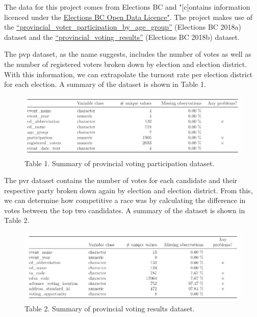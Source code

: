 \documentclass[
]{article}
\begin{document}
The data for this project comes from Elections BC and "{[}c{]}ontains
information licenced under the
\href{https://www.elections.bc.ca/docs/EBC-Open-Data-Licence.pdf}{Elections
BC Open Data Licence"}. The project makes use of the
\href{https://catalogue.data.gov.bc.ca/dataset/6d9db663-8c30-43ec-922b-d541d22e634f/resource/646530d4-078c-4815-8452-c75639962bb4}{``provincial\_voter\_participation\_by\_age\_group''}
(Elections BC 2018a) dataset and the
\href{https://catalogue.data.gov.bc.ca/dataset/44914a35-de9a-4830-ac48-870001ef8935/resource/fb40239e-b718-4a79-b18f-7a62139d9792}{``provincial\_voting\_results''}
(Elections BC 2018b) dataset.

The pvp dataset, as the name suggests, includes the number of votes as
well as the number of registered voters broken down by election and
election district. With this information, we can extrapolate the turnout
rate per election district for each election. A summary of the dataset
is shown in Table 1.

\begin{figure}
\includegraphics[width=1\linewidth]{../eda/bc_election_turnout_files/figure-html/pvp} \caption{Table 1. Summary of provincial voting participation dataset.}\label{fig:tab_1}
\end{figure}

The pvr dataset contains the number of votes for each candidate and
their respective party broken down again by election and election
district. From this, we can determine how competitive a race was by
calculating the difference in votes between the top two candidates. A
summary of the dataset is shown in Table 2.

\begin{figure}
\includegraphics[width=1\linewidth]{../eda/bc_election_turnout_files/figure-html/pvr} \caption{Table 2. Summary of provincial voting results dataset.}\label{fig:unnamed-chunk-1}
\end{figure}
\end{document}
